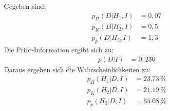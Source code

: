 Gegeben sind:
\begin{align*}
	p_\Pi(D|H_1,I) &= 0,07	\\
	p_K(D|H_2,I) &= 0,5	\\
	p_p(D|H_3,I) &= 1,3
\end{align*}
Die Prior-Information ergibt sich zu:
\begin{align*}
	p(D|I) &= 0,236
\end{align*}
Daraus ergeben sich die Wahrscheinlichkeiten zu:
\begin{align*}
	p_\Pi(H_1|D,I) & = \SI{23,73}{\percent}	\\
	p_K(H_2|D,I) & = \SI{21,19}{\percent}	\\
	p_p(H_3|D,I) &= \SI{55,08}{\percent}
\end{align*}
